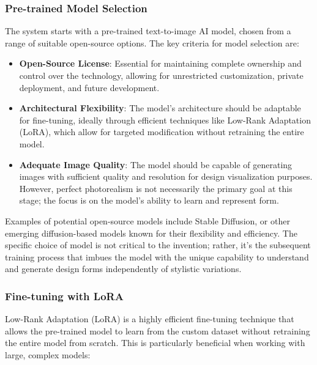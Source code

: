 \subsubsection{Pre-trained Model Selection}
The system starts with a pre-trained text-to-image AI model, chosen from a range of suitable open-source options. The key criteria for model selection are:

\begin{itemize}
    \item \textbf{Open-Source License}: Essential for maintaining complete ownership and control over the technology, allowing for unrestricted customization, private deployment, and future development.
    \item \textbf{Architectural Flexibility}: The model's architecture should be adaptable for fine-tuning, ideally through efficient techniques like Low-Rank Adaptation (LoRA), which allow for targeted modification without retraining the entire model.
    \item \textbf{Adequate Image Quality}: The model should be capable of generating images with sufficient quality and resolution for design visualization purposes. However, perfect photorealism is not necessarily the primary goal at this stage; the focus is on the model's ability to learn and represent form.
\end{itemize}

Examples of potential open-source models include Stable Diffusion, or other emerging diffusion-based models known for their flexibility and efficiency. The specific choice of model is not critical to the invention; rather, it's the subsequent training process that imbues the model with the unique capability to understand and generate design forms independently of stylistic variations.

\subsubsection{Fine-tuning with LoRA}
Low-Rank Adaptation (LoRA) is a highly efficient fine-tuning technique that allows the pre-trained model to learn from the custom dataset without retraining the entire model from scratch. This is particularly beneficial when working with large, complex models:

